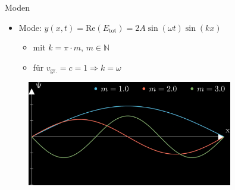 \documentclass{beamer}
\begin{document}
\begin{frame}{Moden}
	\begin{itemize}
		\item Mode: $y(x,t)=\text{Re}(E_{\text{tot}})=2A\sin{(\omega t)}\sin{(kx)}$
		      \begin{itemize}
			      \item mit $k=\pi\cdot m$, $m\in \mathbb{N}$
			      \item für $v_{\text{gr.}}=c=1 \Rightarrow k=\omega$
		      \end{itemize}
	\end{itemize}
	\begin{figure}
		\center\includegraphics[width=0.8\textwidth]{images/harmonics.png}
	\end{figure}
\end{frame}
\end{document}
